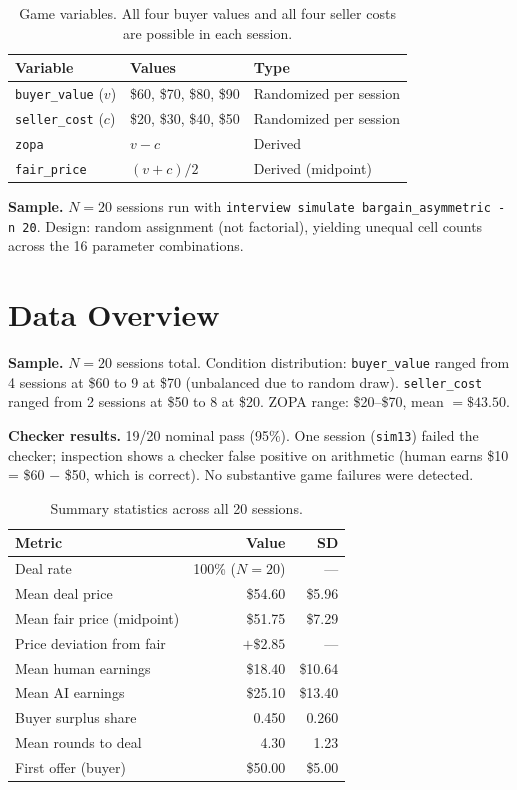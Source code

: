 \documentclass[11pt]{article}
\begin{document}
\begin{table}[h!]
\centering
\begin{tabular}{@{}lll@{}}
\toprule
Variable & Values & Type \\
\midrule
\texttt{buyer\_value} ($v$) & \$60, \$70, \$80, \$90 & Randomized per session \\
\texttt{seller\_cost} ($c$) & \$20, \$30, \$40, \$50 & Randomized per session \\
\texttt{zopa} & $v - c$ & Derived \\
\texttt{fair\_price} & $(v + c)/2$ & Derived (midpoint) \\
\bottomrule
\end{tabular}
\caption{Game variables. All four buyer values and all four seller costs are possible in each session.}
\end{table}

\noindent\textbf{Sample.} $N = 20$ sessions run with \texttt{interview simulate bargain\_asymmetric -n 20}. Design: random assignment (not factorial), yielding unequal cell counts across the 16 parameter combinations.

\section*{Data Overview}

\textbf{Sample.} $N = 20$ sessions total. Condition distribution: \texttt{buyer\_value} ranged from 4 sessions at \$60 to 9 at \$70 (unbalanced due to random draw). \texttt{seller\_cost} ranged from 2 sessions at \$50 to 8 at \$20. ZOPA range: \$20--\$70, mean $= \$43.50$.

\textbf{Checker results.} 19/20 nominal pass (95\%). One session (\texttt{sim13}) failed the checker; inspection shows a checker false positive on arithmetic (human earns \$10 = \$60 $-$ \$50, which is correct). No substantive game failures were detected.

\begin{table}[h!]
\centering
\begin{tabular}{@{}lrr@{}}
\toprule
Metric & Value & SD \\
\midrule
Deal rate & 100\% ($N=20$) & --- \\
Mean deal price & \$54.60 & \$5.96 \\
Mean fair price (midpoint) & \$51.75 & \$7.29 \\
Price deviation from fair & $+\$2.85$ & --- \\
Mean human earnings & \$18.40 & \$10.64 \\
Mean AI earnings & \$25.10 & \$13.40 \\
Buyer surplus share & 0.450 & 0.260 \\
Mean rounds to deal & 4.30 & 1.23 \\
First offer (buyer) & \$50.00 & \$5.00 \\
\bottomrule
\end{tabular}
\caption{Summary statistics across all 20 sessions.}
\end{table}
\end{document}
